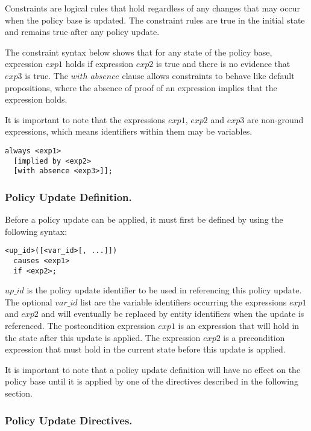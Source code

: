 \documentclass{llncs}
\begin{document}
        Constraints are logical rules that hold regardless of any changes
        that may occur when the policy base is updated. The constraint rules
        are true in the initial state and remains true after any policy
        update.

        The constraint syntax below shows that for any state of the policy
        base, expression $exp1$ holds if expression $exp2$ is true and there
        is no evidence that $exp3$ is true. The $with$ $absence$ clause
        allows constraints to behave like default propositions, where the
        absence of proof of an expression implies that the expression holds.

        It is important to note that the expressions $exp1$, $exp2$ and
        $exp3$ are non-ground expressions, which means identifiers within
        them may be variables.

        \begin{verbatim}always <exp1>
  [implied by <exp2>
  [with absence <exp3>]];\end{verbatim}

      \subsubsection{Policy Update Definition.}

        Before a policy update can be applied, it must first be defined by
        using the following syntax:

        \begin{verbatim}<up_id>([<var_id>[, ...]])
  causes <exp1>
  if <exp2>;\end{verbatim}

        $up\_id$ is the policy update identifier to be used in referencing
        this policy update. The optional $var\_id$ list are the variable
        identifiers occurring the expressions $exp1$ and $exp2$ and will
        eventually be replaced by entity identifiers when the update is
        referenced. The postcondition expression $exp1$ is an expression that
        will hold in the state after this update is applied. The expression
        $exp2$ is a precondition expression that must hold in the current
        state before this update is applied.

        It is important to note that a policy update definition will have no
        effect on the policy base until it is applied by one of the
        directives described in the following section.

      \subsubsection{Policy Update Directives.}
\end{document}
